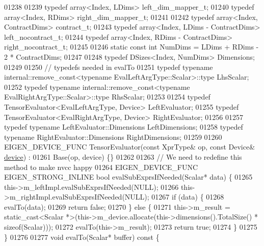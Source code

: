 \begin{DoxyCode}
01238 
01239   \textcolor{keyword}{typedef} array<Index, LDims> left\_dim\_mapper\_t;
01240   \textcolor{keyword}{typedef} array<Index, RDims> right\_dim\_mapper\_t;
01241 
01242   \textcolor{keyword}{typedef} array<Index, ContractDims> contract\_t;
01243   \textcolor{keyword}{typedef} array<Index, LDims - ContractDims> left\_nocontract\_t;
01244   \textcolor{keyword}{typedef} array<Index, RDims - ContractDims> right\_nocontract\_t;
01245 
01246   \textcolor{keyword}{static} \textcolor{keyword}{const} \textcolor{keywordtype}{int} NumDims = LDims + RDims - 2 * ContractDims;
01247 
01248   \textcolor{keyword}{typedef} DSizes<Index, NumDims> Dimensions;
01249 
01250   \textcolor{comment}{// typedefs needed in evalTo}
01251   \textcolor{keyword}{typedef} \textcolor{keyword}{typename} internal::remove\_const<typename EvalLeftArgType::Scalar>::type LhsScalar;
01252   \textcolor{keyword}{typedef} \textcolor{keyword}{typename} internal::remove\_const<typename EvalRightArgType::Scalar>::type RhsScalar;
01253 
01254   \textcolor{keyword}{typedef} TensorEvaluator<EvalLeftArgType, Device> LeftEvaluator;
01255   \textcolor{keyword}{typedef} TensorEvaluator<EvalRightArgType, Device> RightEvaluator;
01256 
01257   \textcolor{keyword}{typedef} \textcolor{keyword}{typename} LeftEvaluator::Dimensions LeftDimensions;
01258   \textcolor{keyword}{typedef} \textcolor{keyword}{typename} RightEvaluator::Dimensions RightDimensions;
01259 
01260   EIGEN\_DEVICE\_FUNC TensorEvaluator(\textcolor{keyword}{const} XprType& op, \textcolor{keyword}{const} Device& \hyperlink{struct_eigen_1_1_tensor_evaluator_a98b51809ed8f7a1f736eb7b952b9636e}{device}) :
01261       Base(op, device) \{\}
01262 
01263   \textcolor{comment}{// We need to redefine this method to make nvcc happy}
01264   EIGEN\_DEVICE\_FUNC EIGEN\_STRONG\_INLINE \textcolor{keywordtype}{bool} evalSubExprsIfNeeded(Scalar* data) \{
01265     this->m\_leftImpl.evalSubExprsIfNeeded(NULL);
01266     this->m\_rightImpl.evalSubExprsIfNeeded(NULL);
01267     \textcolor{keywordflow}{if} (data) \{
01268       evalTo(data);
01269       \textcolor{keywordflow}{return} \textcolor{keyword}{false};
01270     \} \textcolor{keywordflow}{else} \{
01271       this->m\_result = \textcolor{keyword}{static\_cast<}Scalar *\textcolor{keyword}{>}(this->m\_device.allocate(this->dimensions().TotalSize() * \textcolor{keyword}{
      sizeof}(Scalar)));
01272       evalTo(this->m\_result);
01273       \textcolor{keywordflow}{return} \textcolor{keyword}{true};
01274     \}
01275   \}
01276 
01277   \textcolor{keywordtype}{void} evalTo(Scalar* buffer)\textcolor{keyword}{ const }\{

\end{DoxyCode}
